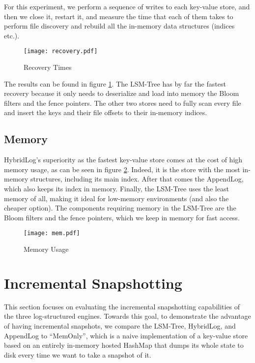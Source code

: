 For this experiment, we perform a sequence of writes to each key-value store, and then we close it, restart it, and measure the time that each of them takes to perform file discovery and rebuild all the in-memory data structures (indices etc.).

\begin{figure}[h]
    \centering
    \texttt{[image: recovery.pdf]}
    \caption{Recovery Times}
    \label{fig:recovery}
\end{figure}

The results can be found in figure \ref{fig:recovery}. The LSM-Tree has by far the fastest recovery because it only needs to deserialize and load into memory the Bloom filters and the fence pointers. The other two stores need to fully scan every file and insert the keys and their file offsets to their in-memory indices.

\subsection{Memory}

HybridLog's superiority as the fastest key-value store comes at the cost of high memory usage, as can be seen in figure \ref{fig:comparison-memory}. Indeed, it is the store with the most in-memory structures, including its main index. After that comes the AppendLog, which also keeps its index in memory. Finally, the LSM-Tree uses the least memory of all, making it ideal for low-memory environments (and also the cheaper option). The components requiring memory in the LSM-Tree are the Bloom filters and the fence pointers, which we keep in memory for fast access.

\begin{figure}[h]
    \centering
    \texttt{[image: mem.pdf]}
    \caption{Memory Usage}
    \label{fig:comparison-memory}
\end{figure}

\section{Incremental Snapshotting}

This section focuses on evaluating the incremental snapshotting capabilities of the three log-structured engines. Towards this goal, to demonstrate the advantage of having incremental snapshots, we compare the LSM-Tree, HybridLog, and AppendLog to ``MemOnly'', which is a naive implementation of a key-value store based on an entirely in-memory hosted HashMap that dumps its whole state to disk every time we want to take a snapshot of it.

